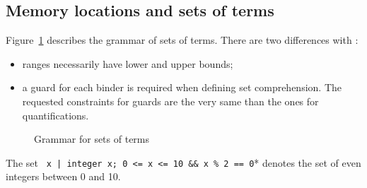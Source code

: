 \nodiff


\subsection{Memory locations and sets of terms}
\label{sec:locations}


Figure~\ref{fig:gram:locations} describes the grammar of sets of terms. There
are two differences with \acsl:
\begin{itemize}
\item ranges necessarily have lower and upper bounds;
\item a guard for each binder is required when defining set comprehension. The
  requested constraints for guards are the very same than the ones for
  quantifications.
\end{itemize}
  
\begin{figure}[htbp]
  \caption{Grammar for sets of terms}
\label{fig:gram:locations}
\end{figure}

\begin{notimplementedenv}
\begin{example}\label{ex:tset}
The set \lstinline*{ x | integer x; 0 <= x <= 10 && x % 2 == 0}* denotes the
set of even integers between 0 and 10.
\end{example}
\end{notimplementedenv}


